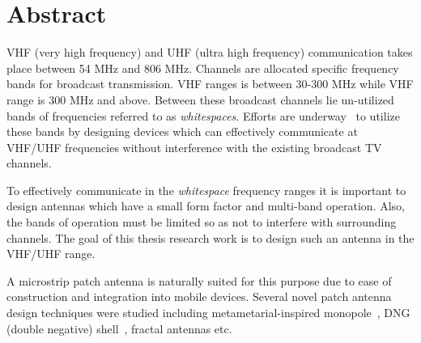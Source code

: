 

\chapter*{Abstract}
VHF (very high frequency) and UHF (ultra high frequency) communication takes place
between 54 MHz and 806 MHz. Channels are allocated specific frequency bands for
broadcast transmission. VHF ranges is between 30-300 MHz while VHF range is 300 MHz
and above. Between these broadcast channels lie un-utilized bands of frequencies
referred to as {\em whitespaces}. Efforts are underway~\cite{FCCTest} to utilize these
bands by designing devices which can effectively communicate at VHF/UHF frequencies
without interference with the existing broadcast TV channels.

To effectively communicate in the {\em whitespace} frequency ranges it is important
to design antennas which have a small form factor and multi-band operation. Also, the
bands of operation must be limited so as not to interfere with surrounding channels.
The goal of this thesis research work is to design such an antenna in the VHF/UHF range.

A microstrip patch antenna is naturally suited for this purpose due to ease of construction
and integration into mobile devices. Several novel patch antenna design techniques were studied
including metametarial-inspired monopole~\cite{tribandMM}, DNG (double negative) shell~\cite{DNGShell},
fractal antennas etc.